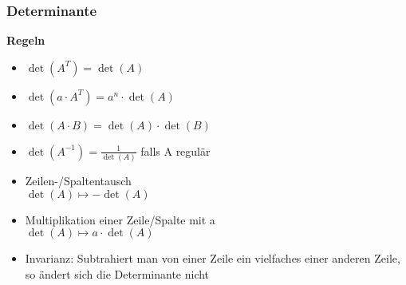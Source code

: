 \subsubsection{Determinante}
\textbf{Regeln}
\begin{itemize}
    \item $\det(A^{T}) = \det(A)$
    \item $\det(a \cdot A^{T}) = a^n \cdot \det(A)$
    \item $\det(A \cdot B) = \det(A) \cdot \det(B)$
    \item $\det(A^{-1}) = \frac{1}{\det(A)}$ falls A regulär
    \item Zeilen-/Spaltentausch\\ $\det(A) \mapsto -\det(A)$
    \item Multiplikation einer Zeile/Spalte mit a\\ $\det(A) \mapsto a \cdot \det(A)$
    \item Invarianz: Subtrahiert man von einer Zeile ein vielfaches einer anderen Zeile, so ändert sich die Determinante nicht
\end{itemize}

